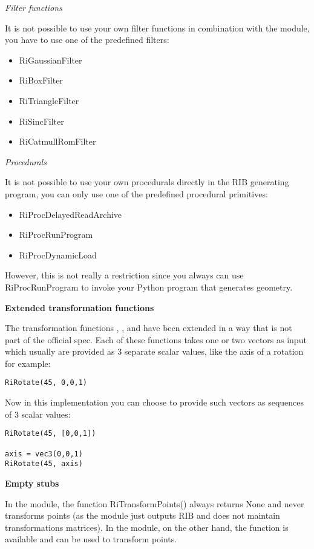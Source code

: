{\em Filter functions}

It is not possible to use your own filter functions in combination
with the  module, you have to use
one of the predefined filters:

\begin{itemize}
\item RiGaussianFilter 
\item RiBoxFilter 
\item RiTriangleFilter 
\item RiSincFilter 
\item RiCatmullRomFilter 
\end{itemize}

{\em Procedurals}

It is not possible to use your own procedurals directly in the RIB
generating program, you can only use one of the predefined procedural
primitives:

\begin{itemize}
\item RiProcDelayedReadArchive 
\item RiProcRunProgram 
\item RiProcDynamicLoad
\end{itemize}

However, this is not really a restriction since you always can use
RiProcRunProgram to invoke your Python program that generates
geometry.

{\bf Extended transformation functions}

The transformation functions , , 
 and  have been extended in a way 
that is not part of the official
spec. Each of these functions takes one or two vectors as input which
usually are provided as 3 separate scalar values, like the axis of a
rotation for example:

\begin{verbatim}
RiRotate(45, 0,0,1) 
\end{verbatim}

Now in this implementation you can choose to provide such vectors as
sequences of 3 scalar values:

\begin{verbatim}
RiRotate(45, [0,0,1]) 

axis = vec3(0,0,1)
RiRotate(45, axis)
\end{verbatim}

{\bf Empty stubs}

In the  module, the function RiTransformPoints() always
returns None and never transforms points (as the module just outputs
RIB and does not maintain transformations matrices).
In the  module, on the other hand, the function is available
and can be used to transform points.

